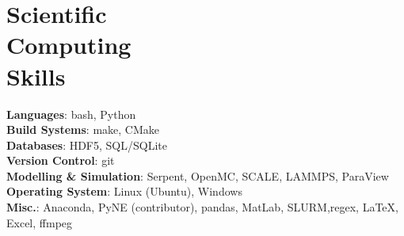 \section{\mysidestyle Scientific\\Computing\\Skills}
\textbf{Languages}: bash, Python\vspace{.5mm}\\%
\textbf{Build Systems}: make, CMake\vspace{.5mm}\\%
\textbf{Databases}: HDF5, SQL/SQLite\vspace{.5mm}\\%
\textbf{Version Control}: git\vspace{.5mm}\\%
\textbf{Modelling \& Simulation}: Serpent, OpenMC, SCALE, LAMMPS, ParaView\vspace{.5mm}\\%
\textbf{Operating System}: Linux (Ubuntu), Windows\vspace{.5mm}\\%
\textbf{Misc.}: Anaconda, PyNE (contributor), pandas, MatLab, SLURM,regex, \LaTeX, Excel, ffmpeg\vspace{.5mm}%

